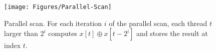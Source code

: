 \begin{figure}[h]
\centering
\texttt{[image: Figures/Parallel-Scan]}
\decoRule
\caption{Parallel scan. For each iteration $i$ of the parallel scan, each thread $t$ larger than $2^i$ computes $x[t] \oplus x[t-2^i]$ and stores the result at index $t$.}
\label{fig:Parallel-Scan}
\end{figure}